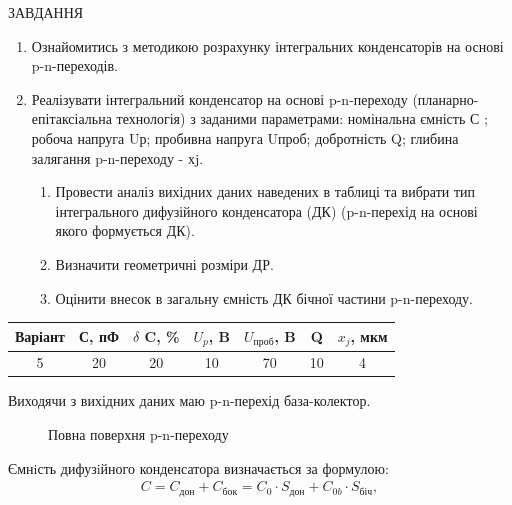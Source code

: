 \documentclass[a4paper,14pt]{extreport}
\begin{document}
\begin{center}ЗАВДАННЯ\end{center}
\renewcommand{\labelenumii}{\arabic{enumi}.\arabic{enumii}.}
\begin{enumerate}
  \item Ознайомитись з методикою розрахунку інтегральних конденсаторів на основі p-n-переходів.
  \item Реалізувати інтегральний конденсатор на основі p-n-переходу (планарно-епітаксіальна технологія) з заданими
  параметрами: номінальна ємність С ; робоча напруга Uр; пробивна напруга Uпроб; добротність Q; глибина залягання p-n-переходу - хj.
  \begin{enumerate} 
    \item  Провести аналіз вихідних даних наведених в таблиці та вибрати тип інтегрального дифузійного конденсатора (ДК) (p-n-перехід на основі якого формується ДК).
    \item  Визначити геометричні розміри ДР.
    \item Оцінити внесок в загальну ємність ДК бічної частини p-n-переходу.
  \end{enumerate}
\end{enumerate}

\vspace{2 cm}

\begin{table}[h]
  \begin{center}
    \begin{tabular}{|c|c|c|c|c|c|c|}
    \hline
    Варіант & С, пФ & $\delta$ C, \% & $U_p$, B & $U_{\text{проб}}$, B & Q  & $x_j$, мкм \\ \hline
    5       & 20    & 20             & 10       & 70                   & 10 & 4          \\ \hline
    \end{tabular}
  \end{center}
\end{table}

Виходячи з вихідних даних маю p-n-перехід база-колектор.

\begin{figure}[h!]
\caption{Повна поверхня p-n-переходу}
\end{figure}
Ємнiсть дифузiйного конденсатора визначається за формулою:
\begin{align}
C = C_{\text{дон}} + C_{\text{бок}} = C_0\cdot S_{\text{дон}} + C_{0b}\cdot S_{\text{біч}},
\end{align}
\end{document}
